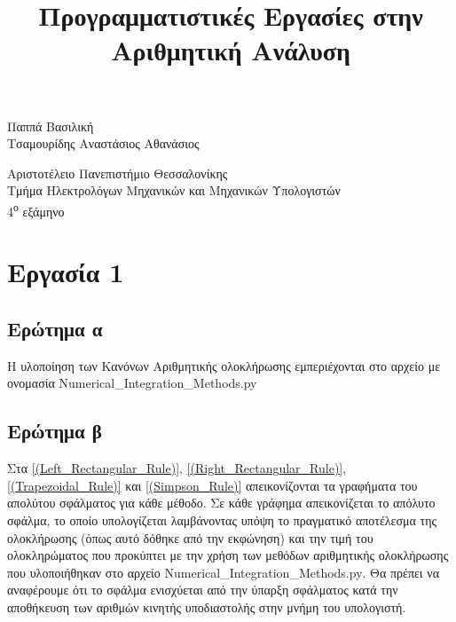 \documentclass{article}
\title{Προγραμματιστικές Εργασίες στην Αριθμητική Ανάλυση}
\author{}
\date{}
\begin{document}
\maketitle
\vspace*{\fill}
\begin{center}
    \begin{large}
    Παππά Βασιλική \\ Τσαμουρίδης Αναστάσιος Αθανάσιος \\
    \end{large}
    \vspace*{\fill}
    Αριστοτέλειο Πανεπιστήμιο Θεσσαλονίκης\\
    Τμήμα Ηλεκτρολόγων Μηχανικών και Μηχανικών Υπολογιστών\\
    4\textsuperscript{ο} εξάμηνο\\
\end{center}
\newpage

\tableofcontents
\newpage

\section{Εργασία 1}
\vspace*{\fill}
\subsection{Ερώτημα α}

Η υλοποίηση των Κανόνων Αριθμητικής ολοκλήρωσης εμπεριέχονται στο αρχείο με ονομασία
\foreignlanguage{english}{Numerical\_Integration\_Methods.py}
\vspace*{\fill}

\subsection{Ερώτημα β}
Στα \autoref{(Left_Rectangular_Rule)}, \autoref{(Right_Rectangular_Rule)}, \autoref{(Trapezoidal_Rule)} και \autoref{(Simpson_Rule)} απεικονίζονται τα γραφήματα του απολύτου σφάλματος για κάθε μέθοδο. Σε κάθε γράφημα απεικονίζεται το απόλυτο σφάλμα, το οποίο υπολογίζεται λαμβάνοντας υπόψη το πραγματικό αποτέλεσμα της ολοκλήρωσης (όπως αυτό δόθηκε από την εκφώνηση) και την τιμή του ολοκληρώματος που προκύπτει με την χρήση των μεθόδων αριθμητικής ολοκλήρωσης που υλοποιήθηκαν στο αρχείο \foreignlanguage{english}{Numerical\_Integration\_Methods.py}. Θα πρέπει να αναφέρουμε ότι το σφάλμα ενισχύεται από την ύπαρξη σφάλματος κατά την αποθήκευση των αριθμών κινητής υποδιαστολής στην μνήμη του υπολογιστή.
\end{document}
